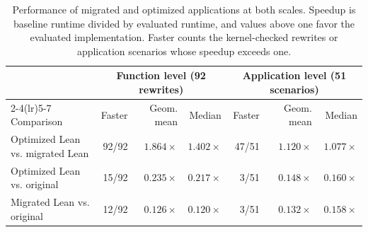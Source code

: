 \documentclass{article}
\begin{document}
\begin{table}[t]
\centering
\caption{Performance of migrated and optimized applications at both scales. Speedup is baseline runtime divided by evaluated runtime, and values above one favor the evaluated implementation. Faster counts the kernel-checked rewrites or application scenarios whose speedup exceeds one.}
\label{tab:software-results}
\small
\setlength{\tabcolsep}{4pt}
\begin{tabular}{lrrrrrr}
\toprule
& \multicolumn{3}{c}{Function level (92 rewrites)} & \multicolumn{3}{c}{Application level (51 scenarios)} \\
\cmidrule(lr){2-4}\cmidrule(lr){5-7}
Comparison & Faster & Geom. mean & Median & Faster & Geom. mean & Median \\
\midrule
Optimized Lean vs. migrated Lean & 92/92 & $1.864\times$ & $1.402\times$ & 47/51 & $1.120\times$ & $1.077\times$ \\
Optimized Lean vs. original & 15/92 & $0.235\times$ & $0.217\times$ & 3/51 & $0.148\times$ & $0.160\times$ \\
Migrated Lean vs. original & 12/92 & $0.126\times$ & $0.120\times$ & 3/51 & $0.132\times$ & $0.158\times$ \\
\bottomrule
\end{tabular}
\end{table}
\end{document}
